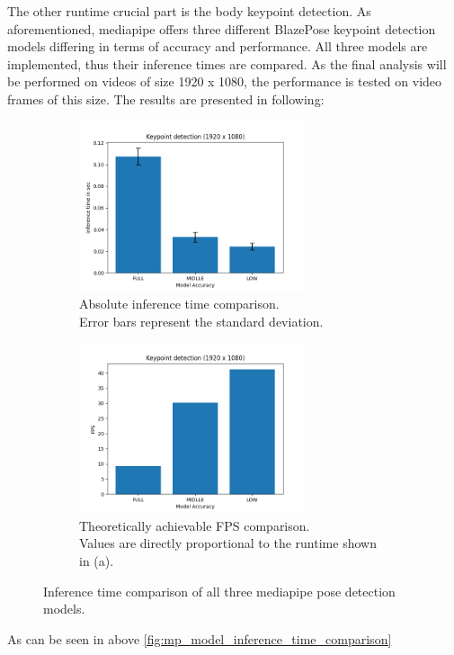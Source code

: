 \noindent The other runtime crucial part is the body keypoint detection.
As aforementioned, mediapipe offers three different BlazePose keypoint
detection models differing in terms of accuracy and performance.
All three models are implemented, thus their inference times are compared.
As the final analysis will be performed on videos of size 1920 x 1080, the
performance is tested on video frames of this size.
The results are presented in following:
\begin{figure}[!h]
    \begin{subfigure}[b]{0.48\textwidth}
        \includegraphics*[height=5cm]{inference_time_models.png}
        \caption{Absolute inference time comparison.\\
        Error bars represent the standard deviation.}
        \label{subfig:absolute_inference_times}
    \end{subfigure}
    \hfill
    \begin{subfigure}[b]{0.48\textwidth}
        \includegraphics*[height=5cm]{inference_fps_models.png} 
        \caption{Theoretically achievable \acs*{FPS} comparison.\\
        Values are directly proportional to the runtime shown in (a).}
        \label{subfig:relative_inference_fps}
    \end{subfigure}
    \caption[Inference time comparison]{Inference time comparison of all three
    mediapipe pose detection models.}
    \label{fig:mp_model_inference_time_comparison}
\end{figure}
\FloatBarrier
\noindent As can be seen in above \autoref{fig:mp_model_inference_time_comparison}
